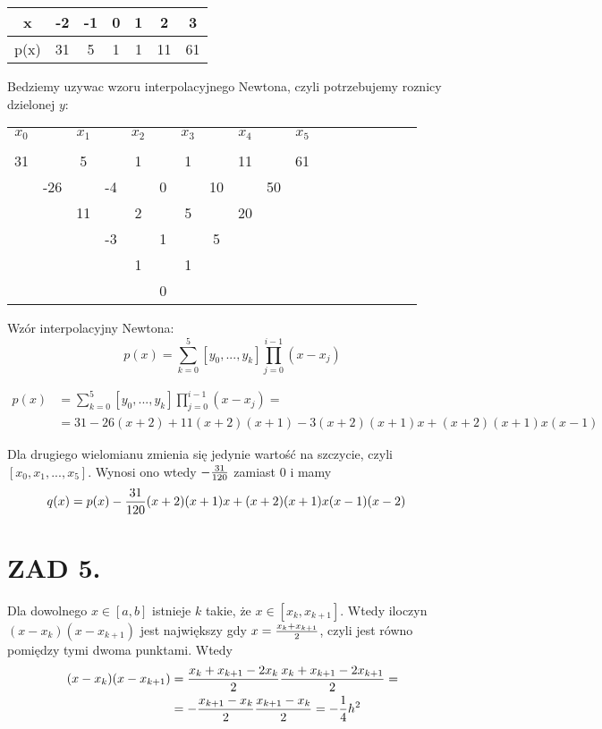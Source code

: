 \documentclass{article}[16pt]
\begin{document}
\begin{center}\begin{tabular}{ | c | c | c | c | c | c | c |}
    \hline

    x & -2 & -1 & 0 & 1 & 2 & 3\\

    \hline

    p(x) & 31 & 5 & 1 & 1 & 11 & 61\\

    \hline
\end{tabular}\end{center}

Bedziemy uzywac wzoru interpolacyjnego Newtona, czyli potrzebujemy roznicy dzielonej $y$:
\begin{center}
\begin{tabular} {c c c c c c c c c c c c c c c c c c}
    $x_0$ & & $x_1$ & & $x_2$ & & $x_3$ & & $x_4$ & & $x_5$\\
    & \\
    31 & & 5 & & 1 & & 1 & & 11 & & 61\\
    & -26 & & -4 && 0 & & 10 & & 50\\
    & & 11 & & 2 & & 5 & & 20\\
    & & & -3 & & 1 & & 5\\
    & & & & 1 & & 1\\
    & & & & & 0
\end{tabular}
\end{center}

Wzór interpolacyjny Newtona:
$$p(x)=\sum\limits_{k=0}^5[y_0,...,y_k]\prod\limits_{j=0}^{i-1}(x-x_j)$$

\begin{align*}
    p(x)&=\sum\limits_{k=0}^5[y_0,...,y_k]\prod\limits_{j=0}^{i-1}(x-x_j)=\\
    &=31 -26(x+2)+11(x+2)(x+1)-3(x+2)(x+1)x+(x+2)(x+1)x(x-1)
\end{align*}

Dla drugiego wielomianu zmienia się jedynie wartość na szczycie, czyli $[x_0,x_1,...,x_5]$. Wynosi ono wtedy $-{31\over120}$ zamiast $0$ i mamy
\begin{align*}
    q(x)&=p(x)-{31\over120}(x+2)(x+1)x+(x+2)(x+1)x(x-1)(x-2)
\end{align*}


\section*{ZAD 5.}

Dla dowolnego $x\in[a,b]$ istnieje $k$ takie, że $x\in[x_k,x_{k+1}]$. Wtedy iloczyn $(x-x_k)(x-x_{k+1})$ jest największy gdy $x={x_k+x_{k+1}\over2}$, czyli jest równo pomiędzy tymi dwoma punktami. Wtedy
\begin{align*}
    (x-x_k)(x-x_{k+1})&={x_k+x_{k+1}-2x_k\over2}{x_k+x_{k+1}-2x_{k+1}\over2}=\\
    &=-{x_{k+1}-x_k\over 2}{x_{k+1}-x_k\over 2}=-\frac14h^2
\end{align*}
\end{document}
